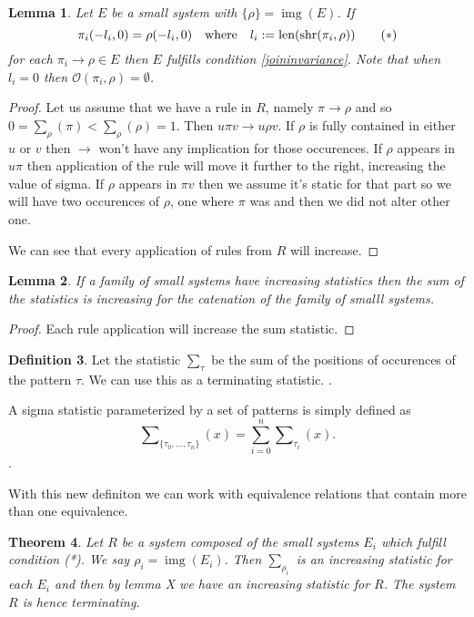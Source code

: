 \documentclass[a4paper, 11pt]{article}
\newtheorem{theorem}{Theorem}[section]
\newtheorem{lemma}[theorem]{Lemma}
\theoremstyle{definition}
\newtheorem{definition}[theorem]{Definition}
\newcommand{\Ocal}{\mathcal{O}}
\DeclareMathOperator{\img}{img}
\DeclareMathOperator{\len}{len}
\DeclareMathOperator{\shr}{shr}
\begin{document}
\begin{lemma}
    Let $E$ be a small system with $\{\rho\} = \img(E)$. If
    \[
        \pi_i(-l_i, 0) = \rho(-l_i, 0) \quad \textnormal{where} \quad l_i :=
        \len(\shr(\pi_i, \rho)) \tag{$\ast$} \label{joininvariance}
    \]
    for each $\pi_i \to \rho \in E$ then $E$ fulfills condition
    \eqref{joininvariance}. Note that
    when $l_i = 0$ then $\Ocal(\pi_i, \rho) = \emptyset$.
\end{lemma}
\begin{proof}
    Let us assume that we have a rule in $R$, namely $\pi \to \rho$ and so
    $0 = \sum_\rho(\pi) < \sum_\rho(\rho) = 1$. Then $u \pi v \to u \rho v$. 
    If $\rho$ is fully contained in either $u$ or $v$ then $\to$ won't have any
    implication for those occurences. If $\rho$ appears in $u\pi$ then
    application of the rule will move it further to the right, increasing the
    value of sigma. If $\rho$ appears in $\pi v$ then we assume it's static for
    that part so we will have two occurences of $\rho$, one where $\pi$ was and
    then we did not alter other one.

    We can see that every application of rules from $R$ will increase.
\end{proof}

\begin{lemma}
    If a family of small systems have increasing statistics then the sum of the
    statistics is increasing for the catenation of the family of smalll systems. 
\end{lemma}
\begin{proof}
    Each rule application will increase the sum statistic.
\end{proof}

\begin{definition}
    Let the statistic $\sum_\tau$ be the sum of the positions of occurences of
    the pattern $\tau$. We can use this as a terminating statistic.
    \cite{claesson}.

    A sigma statistic parameterized by a set of patterns is simply defined as
    $$
        \sum\nolimits_{\{\tau_0, ..., \tau_n\}}(x) = \sum_{i=0}^{n} \sum\nolimits_{\tau_i}(x).
    $$.
\end{definition}

With this new definiton we can work with equivalence relations that contain more than one
equivalence.

\begin{theorem}
    Let $R$ be a system composed of the small systems $E_i$ which fulfill
    condition (*). We say ${\rho_i} = \img(E_i)$. Then $\sum\nolimits_{\rho_i}$ 
    is an increasing statistic for each $E_i$ and then by lemma X we have an increasing statistic for $R$.
    The system $R$ is hence terminating.
\end{theorem}
\end{document}
